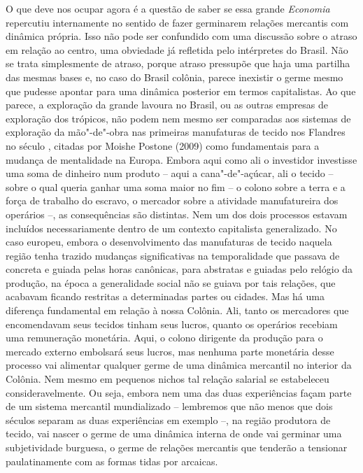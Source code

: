 {O que deve nos ocupar agora é a questão de saber se essa grande \emph{Economia}
repercutiu internamente no sentido de fazer germinarem relações
mercantis com dinâmica própria. Isso não pode ser confundido com uma
discussão sobre o atraso em relação ao centro, uma obviedade já
refletida pelo intérpretes do Brasil. Não se trata simplesmente de
atraso, porque atraso pressupõe que haja uma partilha das mesmas bases
e, no caso do Brasil colônia, parece inexistir o germe mesmo que pudesse
apontar para uma dinâmica posterior em termos capitalistas. Ao que
parece, a exploração da grande lavoura no Brasil, ou as outras empresas
de exploração dos trópicos, não podem nem mesmo ser comparadas aos
sistemas de exploração da mão"-de"-obra nas primeiras manufaturas de
tecido nos Flandres no século , citadas por Moishe Postone (2009)
como fundamentais para a mudança de mentalidade na Europa. Embora aqui
como ali o investidor investisse uma soma de dinheiro num produto --
aqui a cana"-de"-açúcar, ali o tecido -- sobre o qual queria ganhar uma
soma maior no fim -- o colono sobre a terra e a força de trabalho do
escravo, o mercador sobre a atividade manufatureira dos operários --, as
consequências são distintas. Nem um dos dois processos estavam incluídos
necessariamente dentro de um contexto capitalista generalizado. No caso
europeu, embora o desenvolvimento das manufaturas de tecido naquela
região tenha trazido mudanças significativas na temporalidade que
passava de concreta e guiada pelas horas canônicas, para abstratas e
guiadas pelo relógio da produção, na época a generalidade social não se
guiava por tais relações, que acabavam ficando restritas a determinadas
partes ou cidades. Mas há uma diferença fundamental em relação à nossa
Colônia. Ali, tanto os mercadores que encomendavam seus tecidos tinham
seus lucros, quanto os operários recebiam uma remuneração monetária.
Aqui, o colono dirigente da produção para o mercado externo embolsará
seus lucros, mas nenhuma parte monetária desse processo vai alimentar
qualquer germe de uma dinâmica mercantil no interior da Colônia. Nem
mesmo em pequenos nichos tal relação salarial se estabeleceu
consideravelmente. Ou seja, embora nem uma das duas experiências façam
parte de um sistema mercantil mundializado -- lembremos que não menos
que dois séculos separam as duas experiências em exemplo --, na região
produtora de tecido, vai nascer o germe de uma dinâmica interna de onde
vai germinar uma subjetividade burguesa, o germe de relações mercantis
que tenderão a tensionar paulatinamente com as formas tidas por
arcaicas.

}
